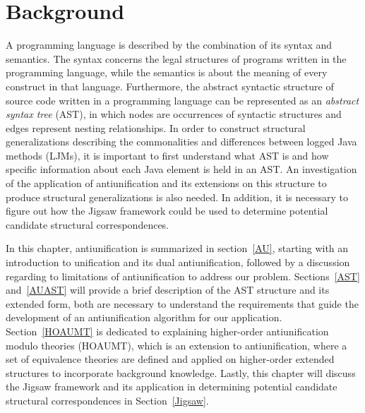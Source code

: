 \chapter{Background}  \label{background}


A programming language is described by the combination of its syntax and semantics. The syntax concerns the legal structures of programs written in the programming language, while the semantics is about the meaning of every construct in that language. Furthermore, the abstract syntactic structure of source code written in a programming language can be represented as an \emph{abstract syntax tree} (AST), in which nodes are occurrences of syntactic structures and edges represent nesting relationships. In order to construct structural generalizations describing the commonalities and differences between logged Java methods (LJMs), it is important to first understand what AST is and how specific information about each Java element is held in an AST\@. An investigation of the application of antiunification and its extensions on this structure to produce structural generalizations is also needed. In addition, it is necessary to figure out how the Jigsaw framework could be used to determine potential candidate structural correspondences.

In this chapter, antiunification is summarized in section~\ref{AU}, starting with an introduction to unification and its dual antiunification, followed by a discussion regarding to limitations of antiunification to address our problem.
Sections~\ref{AST} and~\ref{AUAST} will provide a brief description of the AST structure and its extended form, both are necessary to understand the requirements that guide the development of an antiunification algorithm for our application.
Section~\ref{HOAUMT} is dedicated to explaining higher-order antiunification modulo theories (HOAUMT), which is an extension to antiunification, where a set of equivalence theories are defined and applied on higher-order extended structures to incorporate background knowledge.
Lastly, this chapter will discuss the Jigsaw framework and its application in determining potential candidate structural correspondences in Section~\ref{Jigsaw}.

